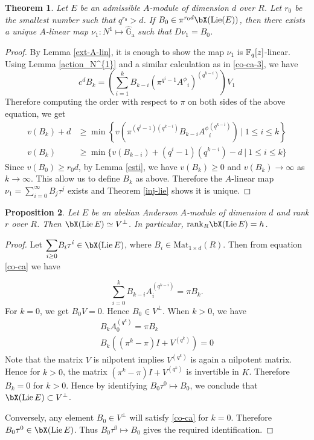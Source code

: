 \documentclass{amsart}
\newtheorem {theorem} {\bf{Theorem}}[section]
\newtheorem {proposition}[theorem] {\bf Proposition}
\numberwithin {equation}{section}
\def \hG{\hat{\mathbb{G}}_{\mathrm{a}}}
\DeclareMathOperator{\Lie}{\mathrm{Lie}}
\begin{document}
\begin{theorem}\label{char-N^1} Let $E$ be an admissible $A$-module of dimension $d$ over $R$. Let $r_{0}$ be the smallest number such that $q^{r_{0}}>d$. If $B_{0}\in \pi^{r_{0}d}\bX(\Lie(E))$, then there exists a unique $A$-linear map $\nu_{1}:N^{1}\mapsto \hG$ such that $D\nu_{1}=B_{0}$.
\end{theorem}
\begin{proof}
By Lemma \ref{ext-A-lin}, it is enough to show the map $\nu_1$ is $\mathbb{F}_{q}[z]$-linear. 
Using Lemma \ref{action_N^{1}} and a similar calculation as in \eqref{co-ca-3}, we have 
$$c^{d} B_{k}=\left(\displaystyle{\sum_{i=1}^{k}} B_{k-i} (\pi^{q^{i}-1}{A^{\phi}}_{i})^{(q^{k-i})}\right)V_{1}$$
Therefore computing the order with respect to $\pi$ on both sides of the above equation, we get 
\begin{align*}
\nonumber v(B_{k})+d&\geq \min\left\{v\left(\pi^{(q^{i}-1)(q^{k-i})}B_{k-i}{A^{\phi}}_{i}^{(q^{k-i})}\right)~|~ 1\leq i\leq k\right\} \\
v(B_{k})&\geq \min\{v(B_{k-i})+(q^{i}-1)(q^{k-i})-d ~|~ 1\leq i\leq k\}
\end{align*}
Since $v(B_{0})\geq r_{0}d$, by Lemma \ref{esti}, we have $v(B_{k})\geq 0$ and $v(B_{k})\rightarrow \infty$ as $k\rightarrow \infty$. This allow us to define $B_{k}$ as above. Therefore the $A$-linear map $\nu_{1}=\displaystyle{\sum_{i=0}^{\infty}}B_{j}\tau^{j}$ exists and Theorem \ref{inj-lie} shows it is unique.
\end{proof}


\begin{proposition}\label{rank-lie} Let $E$ be an abelian Anderson $A$-module of dimension $d$ and rank $r$ over $R$. Then $\bX(\Lie E)\simeq V^{\perp}$. In particular, $\mathrm{rank}_{R}\bX(\Lie E)=h$.
\end{proposition}
\begin{proof}
Let $\displaystyle{\sum_{i\geq 0}} B_{i}\tau^{i}\in \bX(\Lie E)$, where $B_{i}\in \mathrm{Mat}_{1\times d}(R)$. Then from equation \eqref{co-ca} we have

$$\displaystyle{\sum_{i=0}^{k}} B_{k-i} A_{i}^{(q^{k-i})}= \pi B_{k}.$$
For $k=0$, we get $B_{0}V=0$. Hence $B_{0}\in V^{\perp}$. 
When $k>0$, we have 
\begin{align*}
B_{k}A_{0}^{(q^k)}=\pi B_{k} \\
B_{k}((\pi^k -\pi)I + V^{(q^k)})=0
\end{align*}
Note that the matrix $V$ is nilpotent implies $V^{(q^k)}$ is again a nilpotent matrix. Hence for $k>0$, the matrix $(\pi^k -\pi)I + V^{(q^k)}$ is invertible in $K$. Therefore $B_{k}=0$ for $k>0$. Hence  by identifying $B_{0}\tau^{0}\mapsto B_{0}$, we conclude that $\bX(\Lie E)\subset V^{\perp}$.

Conversely, any element $B_{0}\in V^{\perp}$ will satisfy \eqref{co-ca} for $k=0$. Therefore $B_{0}\tau^{0}\in \bX(\Lie E)$. Thus $B_{0}\tau^{0}\mapsto B_{0}$ gives the required identification.
\end{proof}
\end{document}
